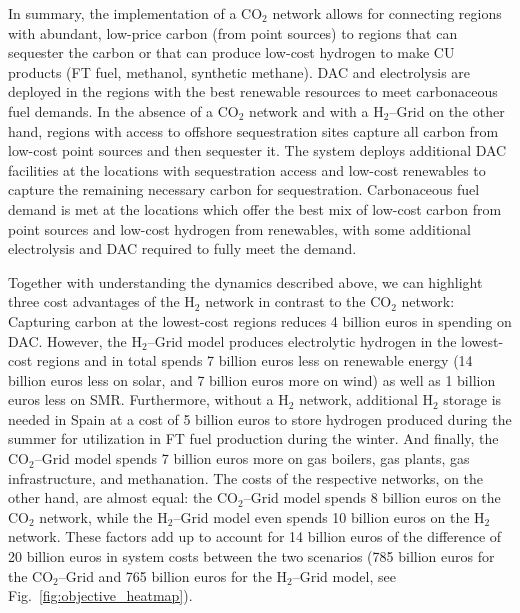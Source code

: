 \documentclass[twocolumn]{article}
\newcommand{\carbon}{CO$_2$}
\newcommand{\hydrogen}{H$_2$}
\newcommand{\carbongrid}{\carbon{}--Grid}
\newcommand{\hydrogengrid}{\hydrogen{}--Grid}
\begin{document}
In summary, the implementation of a \carbon{} network allows for connecting regions with abundant, low-price carbon (from point sources) to regions that can sequester the carbon or that can produce low-cost hydrogen to make CU products (FT fuel, methanol, synthetic methane). DAC and electrolysis are deployed in the regions with the best renewable resources to meet carbonaceous fuel demands.
In the absence of a \carbon{} network and with a \hydrogengrid{} on the other hand, regions with access to offshore sequestration sites capture all carbon from low-cost point sources and then sequester it. The system deploys additional DAC facilities at the locations with sequestration access and low-cost renewables to capture the remaining necessary carbon for sequestration. Carbonaceous fuel demand is met at the locations which offer the best mix of low-cost carbon from point sources and low-cost hydrogen from renewables, with some additional electrolysis and DAC required to fully meet the demand.


Together with understanding the dynamics described above, we can highlight three cost advantages of the \hydrogen{} network in contrast to the \carbon{} network: Capturing carbon at the lowest-cost regions reduces 4 billion euros in spending on DAC. However, the \hydrogengrid{} model produces electrolytic hydrogen in the lowest-cost regions and in total spends 7 billion euros less on renewable energy (14 billion euros less on solar, and 7 billion euros more on wind) as well as 1 billion euros less on SMR. Furthermore, without a \hydrogen{} network, additional \hydrogen{} storage is needed in Spain at a cost of 5 billion euros to store hydrogen produced during the summer for utilization in FT fuel production during the winter.
And finally, the \carbongrid{} model spends 7 billion euros more on gas boilers, gas plants, gas infrastructure, and methanation.
The costs of the respective networks, on the other hand, are almost equal: the \carbongrid{} model spends 8 billion euros on the \carbon{} network, while the \hydrogengrid{} model even spends 10 billion euros on the \hydrogen{} network. These factors add up to account for 14 billion euros of the difference of 20 billion euros in system costs between the two scenarios (785 billion euros for the \carbongrid{} and 765 billion euros for the \hydrogengrid{} model, see Fig.~\ref{fig:objective_heatmap}).
\end{document}
